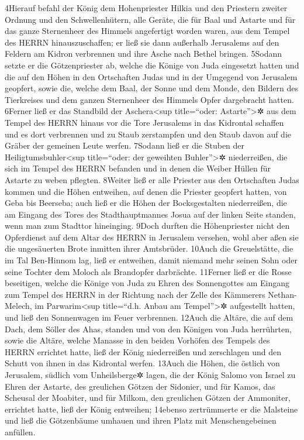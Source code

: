 4Hierauf befahl der König dem Hohenpriester Hilkia und den Priestern
zweiter Ordnung und den Schwellenhütern, alle Geräte, die für Baal und
Astarte und für das ganze Sternenheer des Himmels angefertigt worden
waren, aus dem Tempel des HERRN hinauszuschaffen; er ließ sie dann
außerhalb Jerusalems auf den Feldern am Kidron verbrennen und ihre Asche
nach Bethel bringen. 5Sodann setzte er die Götzenpriester ab, welche die
Könige von Juda eingesetzt hatten und die auf den Höhen in den
Ortschaften Judas und in der Umgegend von Jerusalem geopfert, sowie die,
welche dem Baal, der Sonne und dem Monde, den Bildern des Tierkreises
und dem ganzen Sternenheer des Himmels Opfer dargebracht hatten. 6Ferner
ließ er das Standbild der Aschera\textless sup title=``oder:
Astarte''\textgreater✲ aus dem Tempel des HERRN hinaus vor die Tore
Jerusalems in das Kidrontal schaffen und es dort verbrennen und zu Staub
zerstampfen und den Staub davon auf die Gräber der gemeinen Leute
werfen. 7Sodann ließ er die Stuben der Heiligtumsbuhler\textless sup
title=``oder: der geweihten Buhler''\textgreater✲ niederreißen, die sich
im Tempel des HERRN befanden und in denen die Weiber Hüllen für Astarte
zu weben pflegten. 8Weiter ließ er alle Priester aus den Ortschaften
Judas kommen und die Höhen entweihen, auf denen die Priester geopfert
hatten, von Geba bis Beerseba; auch ließ er die Höhen der Bocksgestalten
niederreißen, die am Eingang des Tores des Stadthauptmannes Josua auf
der linken Seite standen, wenn man zum Stadttor hineinging. 9Doch
durften die Höhenpriester nicht den Opferdienst auf dem Altar des HERRN
in Jerusalem versehen, wohl aber aßen sie die ungesäuerten Brote
inmitten ihrer Amtsbrüder. 10Auch die Greuelstätte, die im Tal
Ben-Hinnom lag, ließ er entweihen, damit niemand mehr seinen Sohn oder
seine Tochter dem Moloch als Brandopfer darbrächte. 11Ferner ließ er die
Rosse beseitigen, welche die Könige von Juda zu Ehren des Sonnengottes
am Eingang zum Tempel des HERRN in der Richtung nach der Zelle des
Kämmerers Nethan-Melech, im Parwarim\textless sup title=``d.h. Anbau am
Tempel''\textgreater✲ aufgestellt hatten, und ließ den Sonnenwagen im
Feuer verbrennen. 12Auch die Altäre, die auf dem Dach, dem Söller des
Ahas, standen und von den Königen von Juda herrührten, sowie die Altäre,
welche Manasse in den beiden Vorhöfen des Tempels des HERRN errichtet
hatte, ließ der König niederreißen und zerschlagen und den Schutt von
ihnen in das Kidrontal werfen. 13Auch die Höhen, die östlich von
Jerusalem, südlich vom Unheilsberge✲ lagen, die der König Salomo von
Israel zu Ehren der Astarte, des greulichen Götzen der Sidonier, und für
Kamos, das Scheusal der Moabiter, und für Milkom, den greulichen Götzen
der Ammoniter, errichtet hatte, ließ der König entweihen; 14ebenso
zertrümmerte er die Malsteine und ließ die Götzenbäume umhauen und ihren
Platz mit Menschengebeinen anfüllen.

